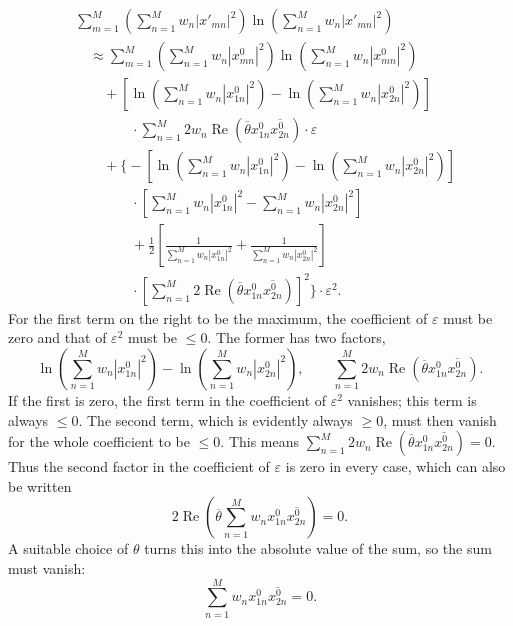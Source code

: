 \documentclass[fontsize=13pt,twoside,openany,headings=normal,parskip=false,bookmarkpackage=false,DIV=calc]{scrbook}
\begin{document}
\begin{align*}
&\sum_{m=1}^M\left(\sum_{n=1}^Mw_n|x'_{mn}|^2\right)\ln\left(\sum_{n=1}^Mw_n|x'_{mn}|^2\right)\\
&\quad\approx\sum_{m=1}^M\left(\sum_{n=1}^Mw_n|x^0_{mn}|^2\right)\ln\left(\sum_{n=1}^Mw_n|x^0_{mn}|^2\right)\\
&\qquad+\left[\ln\left(\sum_{n=1}^Mw_n|x^0_{1n}|^2\right)-\ln\left(\sum_{n=1}^Mw_n|x^0_{2n}|^2\right)\right]\\
&\qquad\qquad\cdot\sum_{n=1}^M2w_n\operatorname{Re}(\overline\theta x^0_{1n}\overline{x^0_{2n}})\cdot\varepsilon\\
&\qquad+\Biggl\{-\left[\ln\left(\sum_{n=1}^Mw_n|x^0_{1n}|^2\right)-\ln\left(\sum_{n=1}^Mw_n|x^0_{2n}|^2\right)\right]\\
&\qquad\qquad\cdot\left[\sum_{n=1}^Mw_n|x^0_{1n}|^2-\sum_{n=1}^Mw_n|x^0_{2n}|^2\right]\\
&\qquad\qquad+\frac12\left[\frac1{\sum_{n=1}^Mw_n|x^0_{1n}|^2}+\frac1{\sum_{n=1}^Mw_n|x^0_{2n}|^2}\right]\\
&\qquad\qquad\cdot\left[\sum_{n=1}^M2\operatorname{Re}(\overline\theta x^0_{1n}\overline{x^0_{2n}})\right]^2\Biggr\}\cdot\varepsilon^2.
\end{align*}
For the first term on the right to be the maximum, the coefficient of $\varepsilon$ must be zero and that of $\varepsilon^2$ must be $\leq0$. The former has two factors,
\[
\ln\left(\sum_{n=1}^Mw_n|x^0_{1n}|^2\right)-\ln\left(\sum_{n=1}^Mw_n|x^0_{2n}|^2\right),
\qquad\sum_{n=1}^M2w_n\operatorname{Re}(\overline\theta x^0_{1n}\overline{x^0_{2n}}).
\]
If the first is zero, the first term in the coefficient of $\varepsilon^2$ vanishes; this term is always $\leq0$. The second term, which is evidently always $\geq0$, must then vanish for the whole coefficient to be $\leq0$. This means $\sum_{n=1}^M2w_n\operatorname{Re}(\overline\theta x^0_{1n}\overline{x^0_{2n}})=0$. Thus the second factor in the coefficient of $\varepsilon$ is zero in every case, which can also be written
\[
2\operatorname{Re}\left(\overline\theta\sum_{n=1}^Mw_nx^0_{1n}\overline{x^0_{2n}}\right)=0.
\]
A suitable choice of $\theta$ turns this into the absolute value of the sum, so the sum must vanish:
\[
\sum_{n=1}^Mw_nx^0_{1n}\overline{x^0_{2n}}=0.
\]
\end{document}
